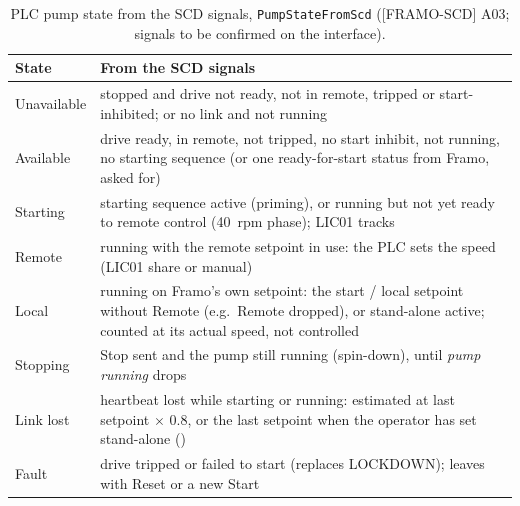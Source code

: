 \documentclass[11pt,a4paper]{article}
\begin{document}
\begin{table}[htbp]
\centering\small
\caption{PLC pump state from the SCD signals, \texttt{PumpStateFromScd} ([FRAMO-SCD] A03; signals to be confirmed on the interface).}
\label{tab:scdstate}
\begin{tabularx}{\textwidth}{@{}P{24mm}L@{}}
\toprule
State & From the SCD signals \\
\midrule
Unavailable & stopped and drive not ready, not in remote, tripped or start-inhibited; or no link and not running \\
Available & drive ready, in remote, not tripped, no start inhibit, not running, no starting sequence (or one ready-for-start status from Framo, asked for) \\
Starting & starting sequence active (priming), or running but not yet ready to remote control (40~rpm phase); LIC01 tracks \\
Remote & running with the remote setpoint in use: the PLC sets the speed (LIC01 share or manual) \\
Local & running on Framo's own setpoint: the start / local setpoint without Remote (e.g.\ Remote dropped), or stand-alone active; counted at its actual speed, not controlled \\
Stopping & Stop sent and the pump still running (spin-down), until \emph{pump running} drops \\
Link lost & heartbeat lost while starting or running: estimated at last setpoint $\times$ 0.8, or the last setpoint when the operator has set stand-alone () \\
Fault & drive tripped or failed to start (replaces LOCKDOWN); leaves with Reset or a new Start \\
\bottomrule
\end{tabularx}
\end{table}
\end{document}
